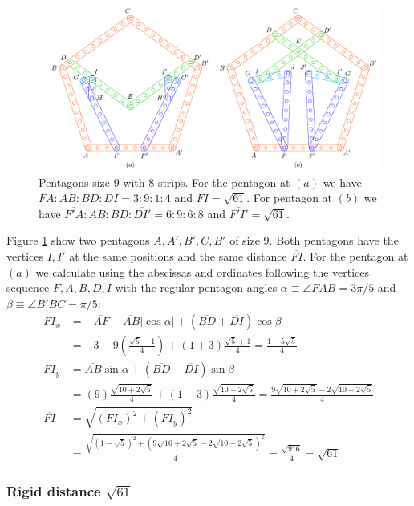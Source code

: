 \documentclass[11pt]{article}
\begin{document}
\begin{figure}[H]
 \centering
 \includegraphics[scale=0.95]{9/penta9-8b}
 \caption{Pentagons size 9 with 8 strips. For the pentagon at $(a)$ we have $\overline{FA}:\overline{AB}:\overline{BD}:\overline{DI} = 3:9:1:4$ and $\overline{FI} = \sqrt{61}$. For pentagon at $(b)$ we have $\overline{F'A}:\overline{AB}:\overline{BD}:\overline{DI'} = 6:9:6:8$ and $\overline{F'I'}=\sqrt{61}$.}
 \label{fig:penta9-8b}
\end{figure}

Figure \ref{fig:penta9-8b} show two pentagons $A,A',B',C,B'$ of size $9$. Both pentagons have the vertices $I,I'$ at the same positions and the same distance $\overline{FI}$. For the pentagon at $(a)$ we calculate using the abscissas and ordinates following the vertices sequence $F,A,B,D,I$ with the regular pentagon angles $\alpha \equiv \angle{FAB} = 3\pi/5$ and $\beta \equiv \angle{B'BC} = \pi/5$:
\begin{align}
FI_x &= -\overline{AF} - \overline{AB}|\cos\alpha| + (\overline{BD} + \overline{DI})\cos\beta\nonumber\\
 &= -3 - 9\left(\frac{\sqrt5-1}4\right) + (1+3)\frac{\sqrt5+1}4 = \frac{1-5\sqrt5}4\\
FI_y &= \overline{AB}\sin\alpha + (\overline{BD}-\overline{DI})\sin\beta\nonumber\\
 &= (9)\frac{\sqrt{10+2\sqrt5}}4 + (1-3)\frac{\sqrt{10-2\sqrt5}}4
 = \frac{9\sqrt{10+2\sqrt5} - 2\sqrt{10-2\sqrt5}}4\\
\overline{FI} &= \sqrt{(FI_x)^2 + (FI_y)^2}\nonumber\\
 &= \frac{\sqrt{(1-\sqrt5)^2 + (9\sqrt{10+2\sqrt5} - 2\sqrt{10-2\sqrt5})^2}}4
 = \frac{\sqrt{976}}4 = \sqrt{61}
\end{align}

\subsubsection{Rigid distance $\sqrt{61}$}
\end{document}
